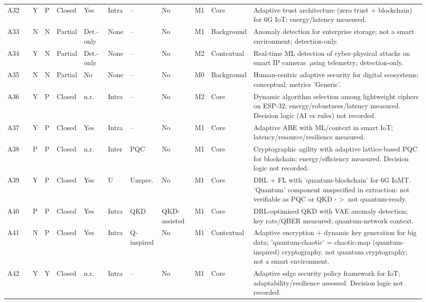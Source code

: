 {\begin{longtable}{p{0.43cm}p{0.8cm}p{0.3cm}p{0.4cm}p{0.8cm}p{0.75cm}p{0.65cm}p{0.8cm}p{0.8cm}p{0.45cm}p{1.1cm}p{4.95cm}}
A32 & \cite{10985891} & Y & P & Closed & Yes & Intra & -- & No & M1 & Core & Adaptive trust architecture (zero trust + blockchain) for 6G IoT; energy/latency measured. \\
A33 & \cite{10972345} & N & N & Partial & Det.-only & None & -- & No & M1 & Background & Anomaly detection for enterprise storage; not a smart environment; detection-only. \\
A34 & \cite{10897877} & Y & N & Partial & Det.-only & None & -- & No & M2 & Contextual & Real-time ML detection of cyber-physical attacks on smart IP cameras~$\mu$sing telemetry; detection-only. \\
A35 & \cite{11153681} & N & N & Partial & No & None & -- & No & M0 & Background & Human-centric adaptive security for digital ecosystems; conceptual; metrics 'Generic'. \\
A36 & \cite{11171742} & Y & P & Closed & n.r. & Intra & -- & No & M2 & Core & Dynamic algorithm selection among lightweight ciphers on ESP-32; energy/robustness/latency measured. Decision logic (AI vs rules) not recorded. \\
A37 & \cite{11171299} & Y & P & Closed & Yes & Intra & -- & No & M1 & Core & Adaptive ABE with ML/context in smart IoT; latency/resource/resilience measured. \\
A38 & \cite{11166257} & P & P & Closed & n.r. & Inter & PQC & No & M1 & Core & Cryptographic agility with adaptive lattice-based PQC for blockchain; energy/efficiency measured. Decision logic not recorded. \\
A39 & \cite{11135745} & Y & P & Closed & Yes & U & Unspec. & No & M1 & Core & DRL + FL with 'quantum-blockchain' for 6G IoMT. 'Quantum' component unspecified in extraction: not verifiable as PQC or QKD -$>$ not quantum-ready. \\
A40 & \cite{SHINGNE2025103445} & P & P & Closed & Yes & Intra & QKD & QKD-assisted & M1 & Core & DRL-optimised QKD with VAE anomaly detection; key rate/QBER measured; quantum-network context. \\
A41 & \cite{KOTANGALE2025103643} & N & P & Closed & Yes & Intra & Q-inspired & No & M1 & Contextual & Adaptive encryption + dynamic key generation for big data; 'quantum-chaotic' = chaotic-map (quantum-inspired) cryptography, not quantum cryptography; not a smart environment. \\
A42 & \cite{HALGAMUGE2025104128} & Y & Y & Closed & n.r. & Intra & -- & No & M1 & Core & Adaptive edge security policy framework for IoT; adaptability/resilience assessed. Decision logic not recorded. \\

\end{longtable}}
